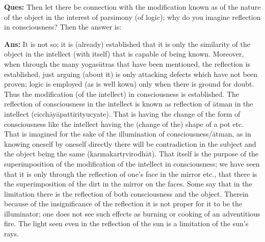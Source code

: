 


\textbf{Ques:} Then let there be connection with the modification known as of the nature of the object in the interest of parsimony (of logic); why do you imagine reflection in consciousness? Then the answer is: 

\textbf{Ans:} It is not so; it is (already) established that it is only the similarity of the object in the intellect (with itself) that is capable of being known. Moreover, when through the many yogasūtras that have been mentioned, the reflection is established, just arguing (about it) is only attacking defects which have not been proven; logic is  employed (as is well kown) only when there is ground for doubt. Thus the modification (of the intellect) in consciousness is established. The reflection of consciousness in the intellect is known as reflection of ātman in the intellect (cicchāyāpattirityucyate). That is having the change of the form of consciousness like the intellect having the (change of the) shape of a pot etc. That is  imagined for the sake of the illumination of consciousness/ātman, as in knowing oneself by oneself directly there will be contradiction in the subject and the object being the same (karmakartṛvirodhāt). That itself is the purpose of the superimposition of the modification of the intellect in consciousness; we have seen that it is only through the reflection of one’s face in the mirror etc., that there is the superimposition of the dirt in the mirror on the faces. Some say that in the limitation there is  the reflection of both consciousness and the object. Therein because of the insignificance of the reflection it is not proper for it to be the illuminator; one does not see such effects as burning or cooking of an adventitious fire. The light seen even in the reflection of the sun is a limitation of the sun’s rays.

